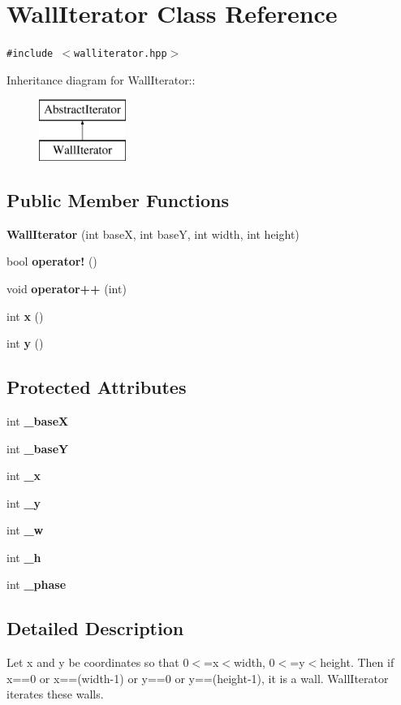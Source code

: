 \section{Wall\-Iterator Class Reference}
\label{classWallIterator}
{\tt \#include $<$walliterator.hpp$>$}

Inheritance diagram for Wall\-Iterator::\begin{figure}[H]
\begin{center}
\leavevmode
\includegraphics[height=2cm]{classWallIterator}
\end{center}
\end{figure}
\subsection*{Public Member Functions}
\begin{CompactItemize}
\item 
{\bf Wall\-Iterator} (int base\-X, int base\-Y, int width, int height)
\item 
bool {\bf operator!} ()
\item 
void {\bf operator++} (int)
\item 
int {\bf x} ()
\item 
int {\bf y} ()
\end{CompactItemize}
\subsection*{Protected Attributes}
\begin{CompactItemize}
\item 
int {\bf \_\-base\-X}
\item 
int {\bf \_\-base\-Y}
\item 
int {\bf \_\-x}
\item 
int {\bf \_\-y}
\item 
int {\bf \_\-w}
\item 
int {\bf \_\-h}
\item 
int {\bf \_\-phase}
\end{CompactItemize}


\subsection{Detailed Description}
Let x and y be coordinates so that 0$<$=x$<$width, 0$<$=y$<$height. Then if x==0 or x==(width-1) or y==0 or y==(height-1), it is a wall. Wall\-Iterator iterates these walls.



